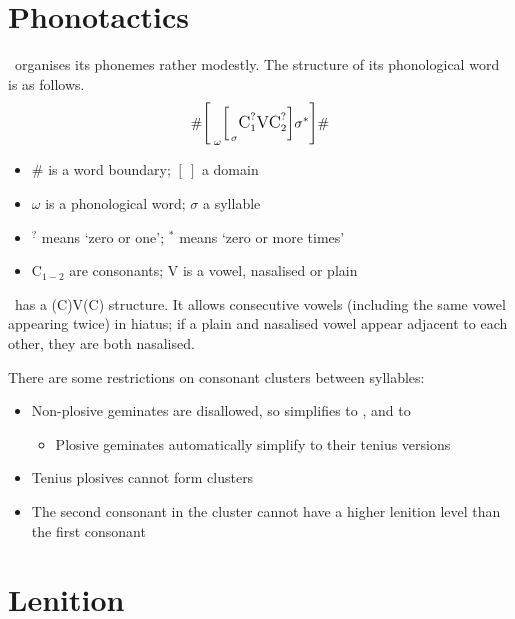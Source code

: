 \section{Phonotactics}
\label{sec:phonotactics}

\langname~organises its phonemes rather modestly.
The structure of its phonological word is as follows.
\[
	\large
	\#
	\bigg[_{\hspace{0.2em}\omega}
	\Big[_{\hspace{0.1em}\sigma}
	\text{C}_1^{?} \text{V} \text{C}_2^{?}
	\Big]
	\sigma^{*}
	\bigg]
	\#
\]

\begin{itemize}
	\item \(\#\) is a word boundary; \([\:]\) a domain
	\item \(\omega\) is a phonological word; \(\sigma\) a syllable
	\item \({}^{?}\) means `zero or one'; \({}^*\) means `zero or more times'
	\item \(\text{C}_{1-2}\) are consonants; \(\text{V}\) is a vowel, nasalised or plain
\end{itemize}

\langname~has a (C)V(C) structure. It allows consecutive vowels (including the same vowel appearing twice) in hiatus;
if a plain and nasalised vowel appear adjacent to each other, they are both nasalised.

There are some restrictions on consonant clusters between syllables:
\begin{itemize}
	\item Non-plosive geminates are disallowed, so  simplifies to , and  to 
	      \begin{itemize}
		      \item Plosive geminates automatically simplify to their tenius versions
	      \end{itemize}
	\item Tenius plosives cannot form clusters
	\item The second consonant in the cluster cannot have a higher lenition level than the first consonant
\end{itemize}

\section{Lenition}
\label{sec:lenition}

